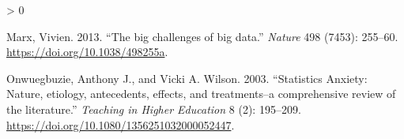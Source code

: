 \documentclass[
]{article}
\newlength{\cslhangindent}
\newenvironment{CSLReferences}[2] %
 {%
  \setlength{\parindent}{0pt}
  \ifodd #1 \everypar{\setlength{\hangindent}{\cslhangindent}}\ignorespaces\fi
  \ifnum #2 > 0
  \setlength{\parskip}{#2\baselineskip}
  \fi
 }%
 {}
\begin{document}
\begin{CSLReferences}{1}{0}
\leavevmode\hypertarget{ref-Marx2013}{}%
Marx, Vivien. 2013. {``{The big challenges of big data}.''}
\emph{Nature} 498 (7453): 255--60.
\url{https://doi.org/10.1038/498255a}.

\leavevmode\hypertarget{ref-Onwuegbuzie2003}{}%
Onwuegbuzie, Anthony J., and Vicki A. Wilson. 2003. {``{Statistics
Anxiety: Nature, etiology, antecedents, effects, and treatments--a
comprehensive review of the literature}.''} \emph{Teaching in Higher
Education} 8 (2): 195--209.
\url{https://doi.org/10.1080/1356251032000052447}.

\end{CSLReferences}
\end{document}
